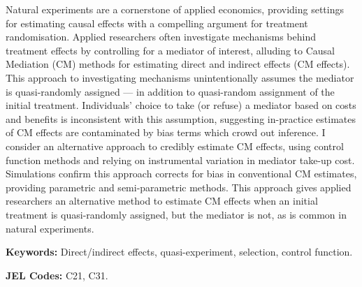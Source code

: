 \noindent
Natural experiments are a cornerstone of applied economics, providing settings for estimating causal effects with a compelling argument for treatment randomisation.
Applied researchers often investigate mechanisms behind treatment effects by controlling for a mediator of interest, alluding to Causal Mediation (CM) methods for estimating direct and indirect effects (CM effects).
This approach to investigating mechanisms unintentionally assumes the mediator is quasi-randomly assigned --- in addition to quasi-random assignment of the initial treatment.
Individuals' choice to take (or refuse) a mediator based on costs and benefits is inconsistent with this assumption, suggesting in-practice estimates of CM effects are contaminated by bias terms which crowd out inference.
I consider an alternative approach to credibly estimate CM effects, using control function methods and relying on instrumental variation in mediator take-up cost.
Simulations confirm this approach corrects for bias in conventional CM estimates, providing parametric and semi-parametric methods.
This approach gives applied researchers an alternative method to estimate CM effects when an initial treatment is quasi-randomly assigned, but the mediator is not, as is common in natural experiments.

\vspace{0.5cm}
\noindent
\textbf{Keywords:}
Direct/indirect effects, quasi-experiment, selection, control function.

\vspace{0.1cm}
\noindent
\textbf{JEL Codes:}
C21, C31.
